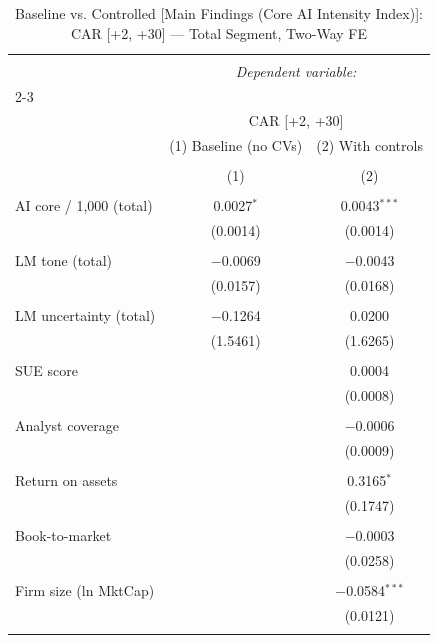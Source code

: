 
\begin{table}[!htbp] \centering 
  \caption{Baseline vs. Controlled [Main Findings (Core AI Intensity Index)]: CAR [+2, +30] — Total Segment, Two-Way FE} 
  \label{} 
\begin{tabular}{@{\extracolsep{5pt}}lcc} 
\\[-1.8ex]\hline 
\hline \\[-1.8ex] 
 & \multicolumn{2}{c}{\textit{Dependent variable:}} \\ 
\cline{2-3} 
\\[-1.8ex] & \multicolumn{2}{c}{CAR [+2, +30]} \\ 
 & (1) Baseline (no CVs) & (2) With controls \\ 
\\[-1.8ex] & (1) & (2)\\ 
\hline \\[-1.8ex] 
 AI core / 1,000 (total) & 0.0027$^{*}$ & 0.0043$^{***}$ \\ 
  & (0.0014) & (0.0014) \\ 
  & & \\ 
 LM tone (total) & $-$0.0069 & $-$0.0043 \\ 
  & (0.0157) & (0.0168) \\ 
  & & \\ 
 LM uncertainty (total) & $-$0.1264 & 0.0200 \\ 
  & (1.5461) & (1.6265) \\ 
  & & \\ 
 SUE score &  & 0.0004 \\ 
  &  & (0.0008) \\ 
  & & \\ 
 Analyst coverage &  & $-$0.0006 \\ 
  &  & (0.0009) \\ 
  & & \\ 
 Return on assets &  & 0.3165$^{*}$ \\ 
  &  & (0.1747) \\ 
  & & \\ 
 Book-to-market &  & $-$0.0003 \\ 
  &  & (0.0258) \\ 
  & & \\ 
 Firm size (ln MktCap) &  & $-$0.0584$^{***}$ \\ 
  &  & (0.0121) \\ 
  & & \\ 

\end{tabular}
\end{table}
